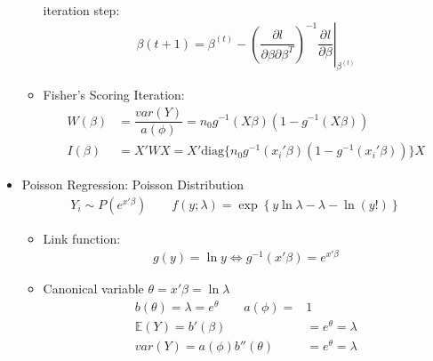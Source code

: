 \begin{itemize}[topsep=2pt,itemsep=0pt]
\begin{itemize}[topsep=2pt,itemsep=0pt]
        iteration step:
        \begin{align}
            \beta {(t+1)}=\beta ^{(t)}-\left.\left( \dfrac{\partial l}{\partial \beta \partial \beta ^T} \right)^{-1}\dfrac{\partial^{} l}{\partial \beta }\right|_{\beta ^{(t)}}
        \end{align}
        \item Fisher's Scoring Iteration:
        \begin{align}
            W(\beta )&=\dfrac{var(Y)}{a(\phi )}=n_0g^{-1}(X\beta )(1-g^{-1}(X\beta ))\\
            I(\beta )&=X'WX=X'\mathrm{diag}\{n_0g^{-1}(x_i'\beta )(1-g^{-1}(x_i'\beta ))\}X 
        \end{align}      
    \end{itemize}
    
    \item Poisson Regression: Poisson Distribution
    \begin{align}
        Y_i\sim P( e^{x'\beta } )\qquad f(y;\lambda )=\exp\left\{ y\ln\lambda -\lambda -\ln(y!) \right\} 
    \end{align}
    \begin{itemize}[topsep=2pt,itemsep=0pt]
        \item Link function:
        \begin{align}
            g(y)=\ln y\Leftrightarrow g^{-1}(x'\beta )=e^{x'\beta } 
        \end{align}
        \item Canonical variable $ \theta =x'\beta =\ln \lambda  $
        \begin{align}
            b(\theta )=\lambda =e^\theta \qquad  a(\phi )=&1\\
            \mathbb{E}(Y)=b'(\beta )&=e^\theta =\lambda \\
            var(Y)=a(\phi )b''(\theta )&=e^\theta =\lambda  
        \end{align}
        
    \end{itemize}
    
        
    
    
    
\end{itemize}





